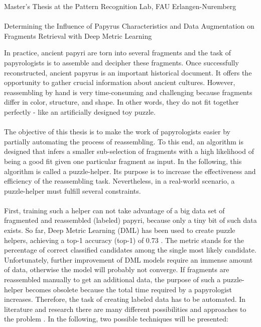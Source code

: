 \documentclass[12pt,a4paper]{article}
\begin{document}
\begin{center}
	Master's Thesis at the Pattern Recognition Lab, FAU Erlangen-Nuremberg \hfill \\[5mm]
																				
	\mbox{}\\
	{\Large Determining the Influence of Papyrus Characteristics and Data Augmentation on Fragments Retrieval with Deep Metric Learning}
			
\end{center}


In practice, ancient papyri are torn into several fragments and the task of papyrologists is to assemble and decipher these fragments. Once successfully reconstructed, ancient papyrus is an important historical document. It offers the opportunity to gather crucial information about ancient cultures.
However, reassembling by hand is very time-consuming and challenging because fragments differ in color, structure, and shape. In other words, they do not fit together perfectly - like an artificially designed toy puzzle. 
\\\\
The objective of this thesis is to make the work of papyrologists easier by partially automating the process of reassembling. To this end, an algorithm is designed that infers a smaller sub-selection of fragments with a high likelihood of being a good fit given one particular fragment as input. 
In the following, this algorithm is called a puzzle-helper. Its purpose is to increase the effectiveness and efficiency of the reassembling task.  Nevertheless, in a real-world scenario, a puzzle-helper must fulfill several constraints.
\\\\
First, training such a helper can not take advantage of a big data set of fragmented and reassembled (labeled) papyri, because only a tiny bit of such data exists. So far, Deep Metric Learning (DML) has been used to create puzzle helpers, achieving a top-1 accuracy (top-1) of 0.73 \cite{Ostertag21, Pirrone21}. The metric stands for the percentage of correct classified candidates among the single most likely candidate. Unfortunately, further improvement of DML models require an immense amount of data, otherwise the model will probably not converge. If fragments are reassembled manually to get an additional data, the purpose of such a puzzle-helper becomes obsolete because the total time required by a papyrologist increases. Therefore, the task of creating labeled data has to be automated. In literature and research there are many different possibilities and approaches to the problem \cite{Goodfellow14}. In the following, two possible techniques will be presented:
\end{document}
